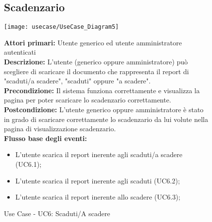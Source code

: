 \begin{figure}[h!]
\subsection{Scadenzario}
   \begin{center}
    \texttt{[image: usecase/UseCase\_Diagram5]} 
    \caption{Use Case - UC6: Scaduti/A scadere}
    \end{center}

\textbf{Attori primari:} Utente generico ed utente amministratore autenticati
\\


\textbf{Descrizione:}   L'utente (generico oppure amministratore) può scegliere di scaricare il documento che rappresenta il report di "scaduti/a scadere", "scaduti" oppure "a scadere".   \\

\textbf{Precondizione:}  Il sistema funziona correttamente e visualizza la pagina per poter scaricare lo scadenzario correttamente. \\

\textbf{Postcondizione:} L'utente generico oppure amministratore è stato in grado di scaricare correttamente lo scadenzario da lui volute nella pagina di visualizzazione scadenzario.  \\


\textbf{Flusso base degli eventi:} 

\begin{itemize}
\item L'utente scarica il report inerente agli scaduti/a scadere (UC6.1);
\item L'utente scarica il report inerente agli scaduti  (UC6.2);
\item L'utente scarica il report inerente allo scadere (UC6.3);
\end{itemize}
\end{figure}


